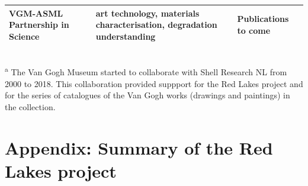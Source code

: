 \begin{appendices}
\begin{table}[!h]
\begin{tabular}{C{2cm}C{4.5cm}C{7cm}}
VGM-ASML Partnership in Science & art technology, materials characterisation, degradation understanding & Publications to come \\
\bottomrule[0.4mm]
\end{tabular}
\label{tab:VGM_projects_list}
\footnotesize{\\ \textsuperscript{a} The Van Gogh Museum started to collaborate with Shell Research NL from 2000 to 2018. This collaboration provided suppport for the Red Lakes project and for the series of catalogues of the Van Gogh works (drawings and paintings) in the collection.}
\end{table}





\newpage
\section[\hspace{0.3cm}Summary of the Red Lakes project]{ Appendix: Summary of the Red Lakes project}
\label{app:ch1_Red-lake_project}



\end{appendices}
